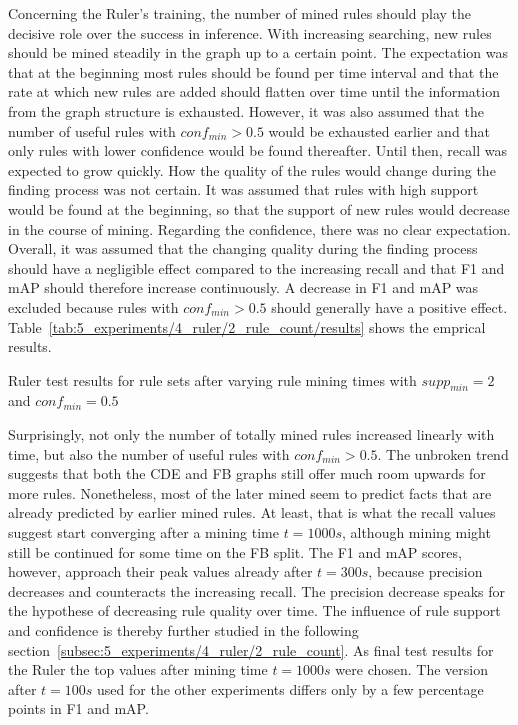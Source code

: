 Concerning the Ruler's training, the number of mined rules should play the decisive role over the success in inference. With increasing searching, new rules should be mined steadily in the graph up to a certain point. The expectation was that at the beginning most rules should be found per time interval and that the rate at which new rules are added should flatten over time until the information from the graph structure is exhausted. However, it was also assumed that the number of useful rules with $conf_{min} > 0.5$ would be exhausted earlier and that only rules with lower confidence would be found thereafter. Until then, recall was expected to grow quickly. How the quality of the rules would change during the finding process was not certain. It was assumed that rules with high support would be found at the beginning, so that the support of new rules would decrease in the course of mining. Regarding the confidence, there was no clear expectation. Overall, it was assumed that the changing quality during the finding process should have a negligible effect compared to the increasing recall and that F1 and mAP should therefore increase continuously. A decrease in F1 and mAP was excluded because rules with $conf_{min} > 0.5$ should generally have a positive effect. Table~\ref{tab:5_experiments/4_ruler/2_rule_count/results} shows the emprical results.

\begin{table}
    \makebox[\textwidth][c]{
        
    }
    \caption{Ruler test results for rule sets after varying rule mining times with $supp_{min} = 2$ and $conf_{min} = 0.5$}
    \label{tab:5_experiments/4_ruler/2_rule_count/results}
\end{table}

Surprisingly, not only the number of totally mined rules increased linearly with time, but also the number of useful rules with $conf_{min} > 0.5$. The unbroken trend suggests that both the CDE and FB graphs still offer much room upwards for more rules. Nonetheless, most of the later mined seem to predict facts that are already predicted by earlier mined rules. At least, that is what the recall values suggest start converging after a mining time $t = 1000s$, although mining might still be continued for some time on the FB split. The F1 and mAP scores, however, approach their peak values already after $t = 300s$, because precision decreases and counteracts the increasing recall. The precision decrease speaks for the hypothese of decreasing rule quality over time. The influence of rule support and confidence is thereby further studied in the following section~\ref{subsec:5_experiments/4_ruler/2_rule_count}. As final test results for the Ruler the top values after mining time $t = 1000s$ were chosen. The version after $t = 100s$ used for the other experiments differs only by a few percentage points in F1 and mAP.
